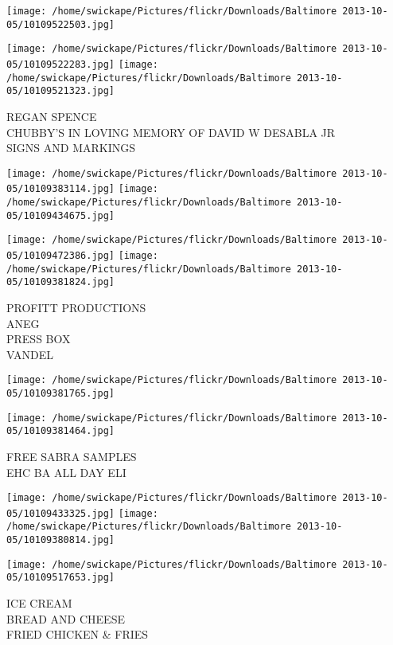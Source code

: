 \documentclass[10pt,letterpaper]{article}
\begin{document}
\texttt{[image: /home/swickape/Pictures/flickr/Downloads/Baltimore 2013-10-05/10109522503.jpg]}

\vspace{0.25in}
\texttt{[image: /home/swickape/Pictures/flickr/Downloads/Baltimore 2013-10-05/10109522283.jpg]}
\texttt{[image: /home/swickape/Pictures/flickr/Downloads/Baltimore 2013-10-05/10109521323.jpg]}

REGAN SPENCE\\
CHUBBY'S IN LOVING MEMORY OF DAVID W DESABLA JR\\
SIGNS AND MARKINGS\\
\pagebreak

\texttt{[image: /home/swickape/Pictures/flickr/Downloads/Baltimore 2013-10-05/10109383114.jpg]}
\texttt{[image: /home/swickape/Pictures/flickr/Downloads/Baltimore 2013-10-05/10109434675.jpg]}

\texttt{[image: /home/swickape/Pictures/flickr/Downloads/Baltimore 2013-10-05/10109472386.jpg]}
\texttt{[image: /home/swickape/Pictures/flickr/Downloads/Baltimore 2013-10-05/10109381824.jpg]}

PROFITT PRODUCTIONS\\
ANEG\\
PRESS BOX\\
VANDEL\\
\pagebreak

\texttt{[image: /home/swickape/Pictures/flickr/Downloads/Baltimore 2013-10-05/10109381765.jpg]}

\vspace{0.25in}
\texttt{[image: /home/swickape/Pictures/flickr/Downloads/Baltimore 2013-10-05/10109381464.jpg]}

FREE SABRA SAMPLES\\
EHC BA ALL DAY ELI\\
\pagebreak

\texttt{[image: /home/swickape/Pictures/flickr/Downloads/Baltimore 2013-10-05/10109433325.jpg]}
\texttt{[image: /home/swickape/Pictures/flickr/Downloads/Baltimore 2013-10-05/10109380814.jpg]}

\texttt{[image: /home/swickape/Pictures/flickr/Downloads/Baltimore 2013-10-05/10109517653.jpg]}

ICE CREAM\\
BREAD AND CHEESE\\
FRIED CHICKEN \& FRIES\\
\pagebreak
\end{document}

